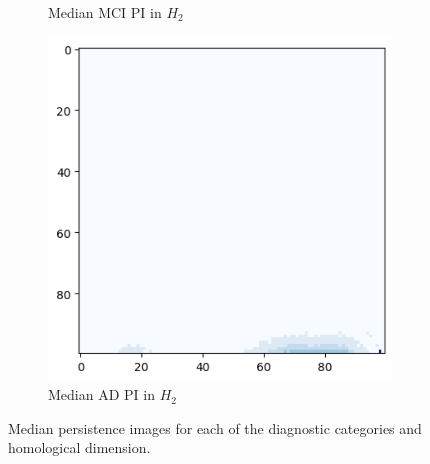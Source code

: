 \documentclass{article}
\begin{document}
\begin{figure}[htb]
\begin{subfigure}{0.32\textwidth}
    \caption{Median MCI PI in $H_2$}
  \end{subfigure}
  \begin{subfigure}{0.32\textwidth}
    \includegraphics[width=\textwidth]{figures/median_pis/median_pi_AD_h_2_rep.png}
    \caption{Median AD PI in $H_2$}
  \end{subfigure}
  \caption{Median persistence images for each of the diagnostic categories and homological
    dimension.}
  \label{fig:median_pis}
\end{figure}
\end{document}
